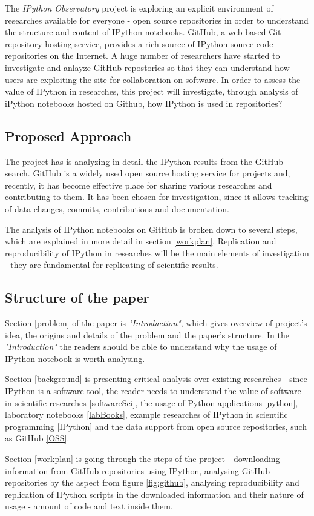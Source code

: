 The \textit{IPython Observatory} project is exploring an explicit environment of researches available for everyone - open source repositories in order to understand the structure and content of IPython notebooks. GitHub, a web-based Git repository hosting service, provides a rich source of IPython source code repositories on the Internet.\cite{gitHubWiki} A huge number of researchers have started to investigate and anlayze GitHub repostories so that they can understand how users are exploiting the site for collaboration on software. \cite{kalliamvakou2007promises} In order to assess the value of IPython in researches, this project will investigate, through analysis of iPython notebooks hosted on Github, how IPython is used in repositories?

\subsection{Proposed Approach}

The project has is analyzing in detail the IPython results from the GitHub search. GitHub is a widely used open source hosting service for projects and, recently, it has become effective place for sharing various researches and contributing to them. It has been chosen for investigation, since it allows tracking of data changes, commits, contributions and documentation. 

The analysis of IPython notebooks on GitHub is broken down to several steps, which are explained in more detail in section \ref{workplan}. Replication and reproducibility of IPython in researches will be the main elements of investigation - they are fundamental for replicating of scientific results. 

\subsection{Structure of the paper}

Section \ref{problem} of the paper is \textit{"Introduction"}, which gives overview of project's idea, the origins and details of the problem and the paper's structure. In the \textit{"Introduction"} the readers should be able to understand why the usage of IPython notebook is worth analysing.

Section \ref{background} is presenting critical analysis over existing researches - since IPython is a software tool, the reader needs to understand the value of software in scientific researches \ref{softwareSci}, the usage of Python applications \ref{python}, laboratory notebooks \ref{labBooks}, example researches of IPython in scientific programming \ref{IPython} and the data support from open source repositories, such as GitHub \ref{OSS}. 

Section \ref{workplan} is going through the steps of the project - downloading information from GitHub repositories using IPython, analysing GitHub repositories by the aspect from figure \ref{fig:github}, analysing reproducibility and replication of IPython scripts in the downloaded information and their nature of usage - amount of code and text inside them. 


